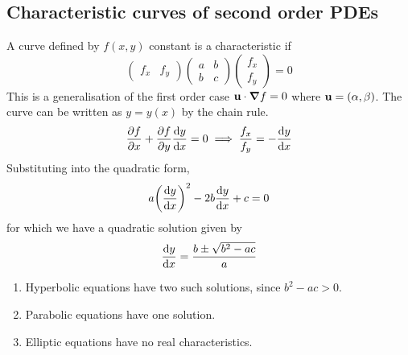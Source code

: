 \documentclass[a4paper]{article}
\begin{document}
\subsection{Characteristic curves of second order PDEs}
A curve defined by \( f(x,y) \) constant is a characteristic if
\[
	\begin{pmatrix}
		f_x & f_y
	\end{pmatrix} \begin{pmatrix}
		a & b \\
		b & c
	\end{pmatrix} \begin{pmatrix}
		f_x \\ f_y
	\end{pmatrix} = 0
\]
This is a generalisation of the first order case \( {\bf u} \cdot \grad{f} = 0 \) where \( {\bf u} = (\alpha, \beta) \).
The curve can be written as \( y = y(x) \) by the chain rule.
\[
	\pdv{f}{x} + \pdv{f}{y} \dv{y}{x} = 0 \implies \frac{f_x}{f_y} = -\dv{y}{x}
\]
Substituting into the quadratic form,
\[
	a \qty(\dv{y}{x})^2 - 2b \dv{y}{x} + c = 0
\]
for which we have a quadratic solution given by
\[
	\dv{y}{x} = \frac{b \pm \sqrt{b^2 - ac}}{a}
\]
\begin{enumerate}
	\item Hyperbolic equations have two such solutions, since \( b^2 - ac > 0 \).
	\item Parabolic equations have one solution.
	\item Elliptic equations have no real characteristics.
\end{enumerate}
\end{document}
